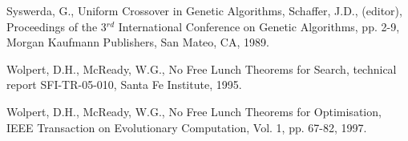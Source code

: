 \begin{thebibliography}{500}
Syswerda, G., Uniform Crossover in Genetic Algorithms, Schaffer, J.D., 
(editor), Proceedings of the 3$^{rd}$ International Conference on Genetic 
Algorithms, pp. 2-9, Morgan Kaufmann Publishers, San Mateo, CA, 1989.

Wolpert, D.H., McReady, W.G., No Free Lunch Theorems for Search, technical 
report SFI-TR-05-010, Santa Fe Institute, 1995.

Wolpert, D.H., McReady, W.G., No Free Lunch Theorems for Optimisation, IEEE 
Transaction on Evolutionary Computation, Vol. 1, pp. 67-82, 1997.

\end{thebibliography}
